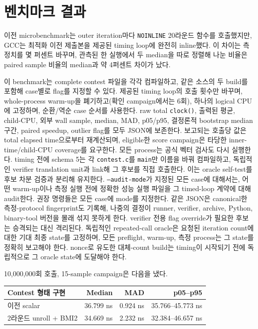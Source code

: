 \documentclass[11pt,a4paper]{article}
\begin{document}
\section{벤치마크 결과}


이전 microbenchmark는 outer iteration마다 \texttt{NOINLINE} 20라운드
함수를 호출했지만, GCC는 최적화 이전 제출본을 제공된 timing loop에
완전히 inline했다.  이 차이는 측정치를 몇 퍼센트 바꾸며, 관측된
한 실행에서 두 median을 따로 정렬해 나눈 비율은 paired sample 비율의
median과 약 4퍼센트 차이가 났다.

이 benchmark는 complete contest 파일을 각각 컴파일하고, 같은 소스의
두 build를 포함해 case별로 flag를 지정할 수 있다.  제공된 timing
loop의 호출 횟수만 바꾸며, whole-process warm-up을 폐기하고(확인
campaign에서는 6회), 하나의 logical CPU에 고정하며, 순환/역순 case
순서를 사용한다.  raw total \texttt{clock()}, 출력된 평균, child-CPU,
외부 wall sample, median, MAD, p05/p95, 결정론적 bootstrap median
구간, paired speedup, outlier flag를 모두 JSON에 보존한다.  보고되는
호출당 값은 total elapsed time으로부터 재계산되며, eligible한 score
campaign은 타당한 inner-time/child-CPU coverage를 요구한다.  모든
process는 공식 벡터 검사도 다시 실행한다.
timing 전에 schema 5는 각 \texttt{contest.c}를 \texttt{main}만 이름을
바꿔 컴파일하고, 독립적인 verifier translation unit과 link해 그 후보를
직접 호출한다.  이는 oracle self-test를 후보 차분 검증과 분리해
유지한다.  \texttt{--audit-mode}가 지정된 모든 case에 대해서는, 어떤
warm-up이나 측정 실행 전에 정확한 성능 실행 파일을 그 timed-loop
계약에 대해 audit한다.  권장 명령들은 모든 case에 mode를 지정한다.
같은 JSON은 canonical한 측정-protocol fingerprint도 기록해, 나중의
결정이 runner, verifier, archive, Python, binary-tool 버전을 몰래 섞지
못하게 한다.  verifier 전용 flag override가 필요한 후보는 승격되는
대신 격리된다.  독립적인 repeated-call oracle은 요청된 iteration
count에 대한 기대 최종 state를 고정하며, 모든 preflight, warm-up, 측정
process는 그 state를 정확히 보고해야 한다.  nonce로 유도한 대체-count
build는 timing이 시작되기 전에 독립적으로 그 oracle state에 도달해야
한다.

10,000,000회 호출, 15-sample campaign은 다음을 냈다.

\begin{center}
\begin{tabular}{lrrr}
\toprule
Contest 형태 구현 & Median & MAD & p05--p95 \\
\midrule
이전 scalar                  & 36.799 ns & 0.924 ns & 35.766--45.773 ns \\
2라운드 unroll + BMI2        & 34.669 ns & 2.232 ns & 32.384--46.657 ns \\
\bottomrule
\end{tabular}
\end{center}
\end{document}
